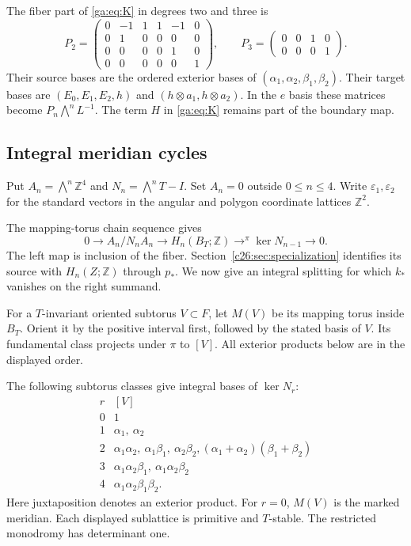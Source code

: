 The fiber part of \eqref{ga:eq:K} in degrees two and three is
\begin{equation}\label{ga:eq:p23}
P_2=\begin{pmatrix}
0&-1&1&1&-1&0\\0&1&0&0&0&0\\0&0&0&0&1&0\\0&0&0&0&0&1
\end{pmatrix},\qquad
P_3=\begin{pmatrix}0&0&1&0\\0&0&0&1\end{pmatrix}.
\end{equation}
Their source bases are the ordered exterior bases of
$(\alpha_1,\alpha_2,\beta_1,\beta_2)$.
Their target bases are $(E_0,E_1,E_2,h)$ and
$(h\otimes a_1,h\otimes a_2)$.
In the $e$ basis these matrices become $P_n\bigwedge^n L^{-1}$.
The term $H$ in \eqref{ga:eq:K} remains part of the boundary map.

\subsection{Integral meridian cycles}

Put $A_n=\bigwedge^n\mathbb Z^4$ and $N_n=\bigwedge^nT-I$.
Set $A_n=0$ outside $0\leq n\leq4$.
Write $\varepsilon_1,\varepsilon_2$ for the standard vectors in
the angular and polygon coordinate lattices $\mathbb Z^2$.

The mapping-torus chain sequence gives
\begin{equation}\label{ga:eq:wang}
0\longrightarrow A_n/N_nA_n\longrightarrow H_n(B_T;\mathbb Z)
\mathrel{\mathop{\longrightarrow}^{\pi}}\ker N_{n-1}\longrightarrow0.
\end{equation}
The left map is inclusion of the fiber.
Section~\ref{c26:sec:specialization} identifies its source with $H_n(Z;\mathbb Z)$ through $p_*$.
We now give an integral splitting for which $k_*$ vanishes on the right summand.

For a $T$-invariant oriented subtorus $V\subset F$, let $M(V)$ be its
mapping torus inside $B_T$. Orient it by the positive interval first,
followed by the stated basis of $V$.
Its fundamental class projects under $\pi$ to $[V]$.
All exterior products below are in the displayed order.

The following subtorus classes give integral bases of $\ker N_r$:
\begin{equation}\label{ga:eq:invariants}
\begin{array}{c|l}
r&[V]\\\hline
0&1\\
1&\alpha_1,\ \alpha_2\\
2&\alpha_1\alpha_2,\ \alpha_1\beta_1,\ \alpha_2\beta_2,
 (\alpha_1+\alpha_2)(\beta_1+\beta_2)\\
3&\alpha_1\alpha_2\beta_1,\ \alpha_1\alpha_2\beta_2\\
4&\alpha_1\alpha_2\beta_1\beta_2.
\end{array}
\end{equation}
Here juxtaposition denotes an exterior product.
For $r=0$, $M(V)$ is the marked meridian.
Each displayed sublattice is primitive and $T$-stable.
The restricted monodromy has determinant one.

